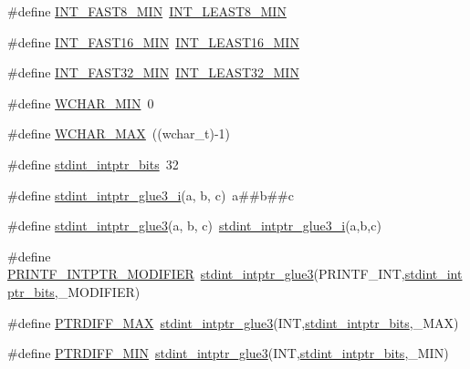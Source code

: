 \begin{DoxyCompactItemize}
\item 
\#define \hyperlink{orstdint_8h_aad8fb982cb19143efd5ee9a1a7a89390}{I\-N\-T\-\_\-\-F\-A\-S\-T8\-\_\-\-M\-I\-N}~\hyperlink{stdint_8h_a3e986cad833f63f420962ff60eda87e5}{I\-N\-T\-\_\-\-L\-E\-A\-S\-T8\-\_\-\-M\-I\-N}
\item 
\#define \hyperlink{orstdint_8h_a169460a4e2a79138723d68d99372d958}{I\-N\-T\-\_\-\-F\-A\-S\-T16\-\_\-\-M\-I\-N}~\hyperlink{stdint_8h_a1f91bfd5820c2f27af3d260fc75813e1}{I\-N\-T\-\_\-\-L\-E\-A\-S\-T16\-\_\-\-M\-I\-N}
\item 
\#define \hyperlink{orstdint_8h_ad93df1652ed0635513d5efe4f1219926}{I\-N\-T\-\_\-\-F\-A\-S\-T32\-\_\-\-M\-I\-N}~\hyperlink{stdint_8h_a2360a536116dd734820a6b5b3d560ce7}{I\-N\-T\-\_\-\-L\-E\-A\-S\-T32\-\_\-\-M\-I\-N}
\item 
\#define \hyperlink{orstdint_8h_a051084d5ebcabf282d9ca9bb2b891a78}{W\-C\-H\-A\-R\-\_\-\-M\-I\-N}~0
\item 
\#define \hyperlink{orstdint_8h_a2a823f3ccf2306cfbaa34d8addf66010}{W\-C\-H\-A\-R\-\_\-\-M\-A\-X}~((wchar\-\_\-t)-\/1)
\item 
\#define \hyperlink{orstdint_8h_a7920cf8565293f3312fe4a5a8829483b}{stdint\-\_\-intptr\-\_\-bits}~32
\item 
\#define \hyperlink{orstdint_8h_aee54e2596fa8124c45c60a4cc6510299}{stdint\-\_\-intptr\-\_\-glue3\-\_\-i}(a, b, c)~a\#\#b\#\#c
\item 
\#define \hyperlink{orstdint_8h_a723e1fbacce0ea8bec3346a93332ee27}{stdint\-\_\-intptr\-\_\-glue3}(a, b, c)~\hyperlink{orstdint_8h_aee54e2596fa8124c45c60a4cc6510299}{stdint\-\_\-intptr\-\_\-glue3\-\_\-i}(a,b,c)
\item 
\#define \hyperlink{orstdint_8h_aed7b3f708da887943672ac786d001a79}{P\-R\-I\-N\-T\-F\-\_\-\-I\-N\-T\-P\-T\-R\-\_\-\-M\-O\-D\-I\-F\-I\-E\-R}~\hyperlink{orstdint_8h_a45b6674a3fc19b6f9017e8eff6de40f2}{stdint\-\_\-intptr\-\_\-glue3}(P\-R\-I\-N\-T\-F\-\_\-\-I\-N\-T,\hyperlink{orstdint_8h_a7920cf8565293f3312fe4a5a8829483b}{stdint\-\_\-intptr\-\_\-bits},\-\_\-\-M\-O\-D\-I\-F\-I\-E\-R)
\item 
\#define \hyperlink{orstdint_8h_add2ef7bffac19cfdd1f4b5495409672f}{P\-T\-R\-D\-I\-F\-F\-\_\-\-M\-A\-X}~\hyperlink{orstdint_8h_a45b6674a3fc19b6f9017e8eff6de40f2}{stdint\-\_\-intptr\-\_\-glue3}(I\-N\-T,\hyperlink{orstdint_8h_a7920cf8565293f3312fe4a5a8829483b}{stdint\-\_\-intptr\-\_\-bits},\-\_\-\-M\-A\-X)
\item 
\#define \hyperlink{orstdint_8h_ad9b88ba2fb858f98b50b38e49875d90e}{P\-T\-R\-D\-I\-F\-F\-\_\-\-M\-I\-N}~\hyperlink{orstdint_8h_a45b6674a3fc19b6f9017e8eff6de40f2}{stdint\-\_\-intptr\-\_\-glue3}(I\-N\-T,\hyperlink{orstdint_8h_a7920cf8565293f3312fe4a5a8829483b}{stdint\-\_\-intptr\-\_\-bits},\-\_\-\-M\-I\-N)

\end{DoxyCompactItemize}
